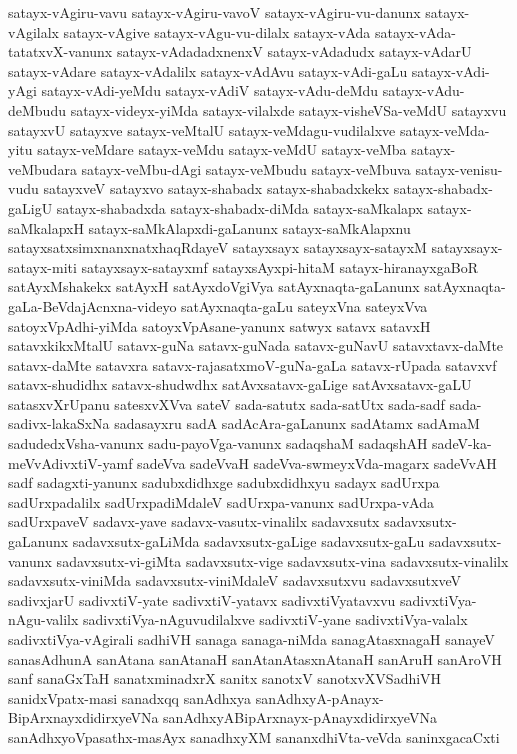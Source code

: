 {satayx-vAgiru-vavu
satayx-vAgiru-vavoV
satayx-vAgiru-vu-danunx
satayx-vAgilalx
satayx-vAgive
satayx-vAgu-vu-dilalx
satayx-vAda
satayx-vAda-tatatxvX-vanunx
satayx-vAdadadxnenxV
satayx-vAdadudx
satayx-vAdarU
satayx-vAdare
satayx-vAdalilx
satayx-vAdAvu
satayx-vAdi-gaLu
satayx-vAdi-yAgi
satayx-vAdi-yeMdu
satayx-vAdiV
satayx-vAdu-deMdu
satayx-vAdu-deMbudu
satayx-videyx-yiMda
satayx-vilalxde
satayx-visheVSa-veMdU
satayxvu
satayxvU
satayxve
satayx-veMtalU
satayx-veMdagu-vudilalxve
satayx-veMda-yitu
satayx-veMdare
satayx-veMdu
satayx-veMdU
satayx-veMba
satayx-veMbudara
satayx-veMbu-dAgi
satayx-veMbudu
satayx-veMbuva
satayx-venisu-vudu
satayxveV
satayxvo
satayx-shabadx
satayx-shabadxkekx
satayx-shabadx-gaLigU
satayx-shabadxda
satayx-shabadx-diMda
satayx-saMkalapx
satayx-saMkalapxH
satayx-saMkAlapxdi-gaLanunx
satayx-saMkAlapxnu
satayxsatxsimxnanxnatxhaqRdayeV
satayxsayx
satayxsayx-satayxM
satayxsayx-satayx-miti
satayxsayx-satayxmf
satayxsAyxpi-hitaM
satayx-hiranayxgaBoR
satAyxMshakekx
satAyxH
satAyxdoVgiVya
satAyxnaqta-gaLanunx
satAyxnaqta-gaLa-BeVdajAcnxna-videyo
satAyxnaqta-gaLu
sateyxVna
sateyxVva
satoyxVpAdhi-yiMda
satoyxVpAsane-yanunx
satwyx
satavx
satavxH
satavxkikxMtalU
satavx-guNa
satavx-guNada
satavx-guNavU
satavxtavx-daMte
satavx-daMte
satavxra
satavx-rajasatxmoV-guNa-gaLa
satavx-rUpada
satavxvf
satavx-shudidhx
satavx-shudwdhx
satAvxsatavx-gaLige
satAvxsatavx-gaLU
satasxvXrUpanu
satesxvXVva
sateV
sada-satutx
sada-satUtx
sada-sadf
sada-sadivx-lakaSxNa
sadasayxru
sadA
sadAcAra-gaLanunx
sadAtamx
sadAmaM
sadudedxVsha-vanunx
sadu-payoVga-vanunx
sadaqshaM
sadaqshAH
sadeV-ka-meVvAdivxtiV-yamf
sadeVva
sadeVvaH
sadeVva-swmeyxVda-magarx
sadeVvAH
sadf
sadagxti-yanunx
sadubxdidhxge
sadubxdidhxyu
sadayx
sadUrxpa
sadUrxpadalilx
sadUrxpadiMdaleV
sadUrxpa-vanunx
sadUrxpa-vAda
sadUrxpaveV
sadavx-yave
sadavx-vasutx-vinalilx
sadavxsutx
sadavxsutx-gaLanunx
sadavxsutx-gaLiMda
sadavxsutx-gaLige
sadavxsutx-gaLu
sadavxsutx-vanunx
sadavxsutx-vi-giMta
sadavxsutx-vige
sadavxsutx-vina
sadavxsutx-vinalilx
sadavxsutx-viniMda
sadavxsutx-viniMdaleV
sadavxsutxvu
sadavxsutxveV
sadivxjarU
sadivxtiV-yate
sadivxtiV-yatavx
sadivxtiVyatavxvu
sadivxtiVya-nAgu-valilx
sadivxtiVya-nAguvudilalxve
sadivxtiV-yane
sadivxtiVya-valalx
sadivxtiVya-vAgirali
sadhiVH
sanaga
sanaga-niMda
sanagAtasxnagaH
sanayeV
sanasAdhunA
sanAtana
sanAtanaH
sanAtanAtasxnAtanaH
sanAruH
sanAroVH
sanf
sanaGxTaH
sanatxminadxrX
sanitx
sanotxV
sanotxvXVSadhiVH
sanidxVpatx-masi
sanadxqq
sanAdhxya
sanAdhxyA-pAnayx-BipArxnayxdidirxyeVNa
sanAdhxyABipArxnayx-pAnayxdidirxyeVNa
sanAdhxyoVpasathx-masAyx
sanadhxyXM
sananxdhiVta-veVda
saninxgacaCxti
}
